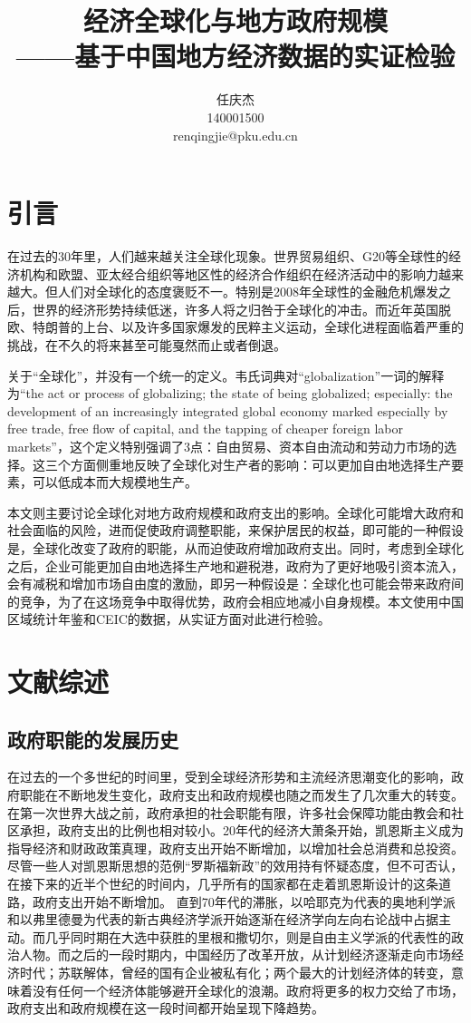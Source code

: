 \documentclass[10pt]{article}
\author{任庆杰\\
		140001500\\
		renqingjie@pku.edu.cn}
\title{经济全球化与地方政府规模\\
——基于中国地方经济数据的实证检验}
\begin{document}
\maketitle{}
\section{引言}
在过去的30年里，人们越来越关注全球化现象。世界贸易组织、G20等全球性的经济机构和欧盟、亚太经合组织等地区性的经济合作组织在经济活动中的影响力越来越大。但人们对全球化的态度褒贬不一。特别是2008年全球性的金融危机爆发之后，世界的经济形势持续低迷，许多人将之归咎于全球化的冲击。而近年英国脱欧、特朗普的上台、以及许多国家爆发的民粹主义运动，全球化进程面临着严重的挑战，在不久的将来甚至可能戛然而止或者倒退。

关于“全球化”，并没有一个统一的定义。韦氏词典对“globalization”一词的解释为“the act or process of globalizing; the state of being globalized; especially: the development of an increasingly integrated global economy marked especially by free trade, free flow of capital, and the tapping of cheaper foreign labor markets”，这个定义特别强调了3点：自由贸易、资本自由流动和劳动力市场的选择。这三个方面侧重地反映了全球化对生产者的影响：可以更加自由地选择生产要素，可以低成本而大规模地生产。

本文则主要讨论全球化对地方政府规模和政府支出的影响。全球化可能增大政府和社会面临的风险，进而促使政府调整职能，来保护居民的权益，即可能的一种假设是，全球化改变了政府的职能，从而迫使政府增加政府支出。同时，考虑到全球化之后，企业可能更加自由地选择生产地和避税港，政府为了更好地吸引资本流入，会有减税和增加市场自由度的激励，即另一种假设是：全球化也可能会带来政府间的竞争，为了在这场竞争中取得优势，政府会相应地减小自身规模。本文使用中国区域统计年鉴和CEIC的数据，从实证方面对此进行检验。

\section{文献综述}
\subsection{政府职能的发展历史}
在过去的一个多世纪的时间里，受到全球经济形势和主流经济思潮变化的影响，政府职能在不断地发生变化，政府支出和政府规模也随之而发生了几次重大的转变。在第一次世界大战之前，政府承担的社会职能有限，许多社会保障功能由教会和社区承担，政府支出的比例也相对较小\cite{Beito2002The}。20年代的经济大萧条开始，凯恩斯主义成为指导经济和财政政策真理，政府支出开始不断增加，以增加社会总消费和总投资。尽管一些人对凯恩斯思想的范例“罗斯福新政”的效用持有怀疑态度\cite{rothbard1972america}，但不可否认，在接下来的近半个世纪的时间内，几乎所有的国家都在走着凯恩斯设计的这条道路，政府支出开始不断增加。
直到70年代的滞胀，以哈耶克为代表的奥地利学派和以弗里德曼为代表的新古典经济学派开始逐渐在经济学向左向右论战中占据主动。而几乎同时期在大选中获胜的里根和撒切尔，则是自由主义学派的代表性的政治人物。而之后的一段时期内，中国经历了改革开放，从计划经济逐渐走向市场经济时代；苏联解体，曾经的国有企业被私有化；两个最大的计划经济体的转变，意味着没有任何一个经济体能够避开全球化的浪潮。政府将更多的权力交给了市场，政府支出和政府规模在这一段时间都开始呈现下降趋势。\added[remark={（表4.5）}]{}
\end{document}

